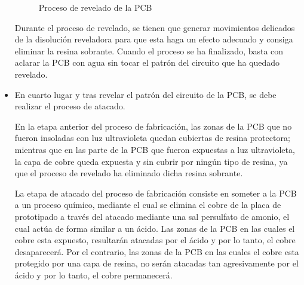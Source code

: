 \begin{itemize}
    \begin{figure}[H]
    \centering
    \caption{Proceso de revelado de la \ac{PCB}}
    \label{fig:lego}
    \end{figure}
    
    Durante el proceso de revelado, se tienen que generar movimientos delicados de la disolución reveladora para que esta haga un efecto adecuado y consiga eliminar la resina sobrante. Cuando el proceso se ha finalizado, basta con aclarar la \ac{PCB} con agua sin tocar el patrón del circuito que ha quedado revelado.
    
    \item En cuarto lugar y tras revelar el patrón del circuito de la \ac{PCB}, se debe realizar el proceso de atacado.
    
   En la etapa anterior del proceso de fabricación, las zonas de la \ac{PCB} que no fueron insoladas con luz ultravioleta quedan cubiertas de resina protectora; mientras que en las parte de la \ac{PCB} que fueron expuestas a luz ultravioleta, la capa de cobre queda expuesta y sin cubrir por ningún tipo de resina, ya que el proceso de revelado ha eliminado dicha resina sobrante.
   
   La etapa de atacado del proceso de fabricación consiste en someter a la \ac{PCB} a un proceso químico, mediante el cual se elimina el cobre de la placa de prototipado a través del atacado mediante una sal persulfato de amonio, el cual actúa de forma similar a un ácido. Las zonas de la \ac{PCB} en las cuales el cobre esta expuesto, resultarán atacadas por el ácido y por lo tanto, el cobre desaparecerá. Por el contrario, las zonas de la \ac{PCB} en las cuales el cobre esta protegido por una capa de resina, no serán atacadas tan agresivamente por el ácido y por lo tanto, el cobre permanecerá.
   

\end{itemize}
